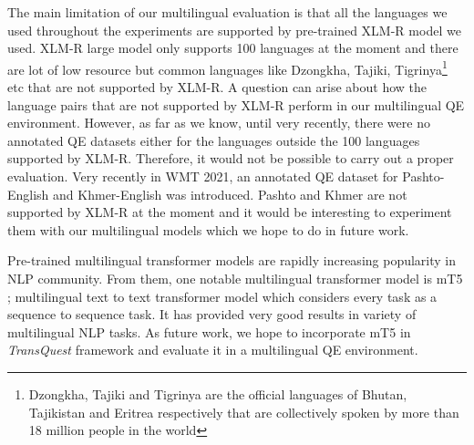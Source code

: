 The main limitation of our multilingual evaluation is that all the languages we used throughout the experiments are supported by pre-trained XLM-R model we used. XLM-R large model only supports 100 languages at the moment and there are lot of low resource but common languages like Dzongkha, Tajiki, Tigrinya\footnote{Dzongkha, Tajiki and Tigrinya are the official languages of Bhutan, Tajikistan and Eritrea respectively that are collectively spoken by more than 18 million people in the world} etc that are not supported by XLM-R. A question can arise about how the language pairs that are not supported by XLM-R perform in our multilingual QE environment. However, as far as we know, until very recently, there were no annotated QE datasets either for the languages outside the 100 languages supported by XLM-R. Therefore, it would not be possible to carry out a proper evaluation. Very recently in WMT 2021, an annotated QE dataset for Pashto-English and Khmer-English was introduced. Pashto and Khmer are not supported by XLM-R at the moment and it would be interesting to experiment them with our multilingual models which we hope to do in future work.

Pre-trained multilingual transformer models are rapidly increasing popularity in NLP community. From them, one notable multilingual transformer model is mT5 \autocite{xue-etal-2021-mt5}; multilingual text to text transformer model which considers every task as a sequence to sequence task. It has provided very good results in variety of multilingual NLP tasks. As future work, we hope to incorporate mT5 in \textit{TransQuest} framework and evaluate it in a multilingual QE environment.


